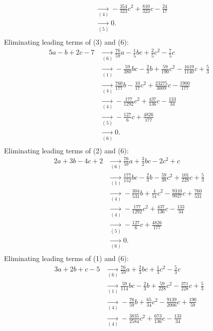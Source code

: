 {\begin{align*}
\\ &\underset{(4)}{\rightarrow}-\frac{354}{323}c^{2}+\frac{810}{323}c-\frac{24}{17}
\\ &\underset{(5)}{\rightarrow}0
.\\ \end{align*}
Eliminating leading terms of (3) and (6):
\begin{align*}
5a-b+2c-7&\underset{(6)}{\rightarrow}\frac{76}{59}a-\frac{1}{5}bc+\frac{2}{5}c^{2}-\frac{7}{5}c
\\ &\underset{(1)}{\rightarrow}-\frac{59}{380}bc-\frac{2}{3}b+\frac{59}{190}c^{2}-\frac{1619}{1140}c+\frac{5}{3}
\\ &\underset{(4)}{\rightarrow}\frac{760}{177}b-\frac{10}{17}c^{2}+\frac{23275}{3009}c-\frac{1900}{177}
\\ &\underset{(4)}{\rightarrow}-\frac{177}{1292}c^{2}+\frac{437}{136}c-\frac{133}{34}
\\ &\underset{(5)}{\rightarrow}-\frac{127}{6}c+\frac{4826}{177}
\\ &\underset{(6)}{\rightarrow}0
.\\ \end{align*}
Eliminating leading terms of (2) and (6):
\begin{align*}
2a+3b-4c+2&\underset{(6)}{\rightarrow}\frac{76}{59}a+\frac{3}{2}bc-2c^{2}+c
\\ &\underset{(1)}{\rightarrow}\frac{177}{152}bc-\frac{2}{3}b-\frac{59}{38}c^{2}+\frac{101}{228}c+\frac{5}{3}
\\ &\underset{(4)}{\rightarrow}-\frac{304}{531}b+\frac{4}{51}c^{2}-\frac{9310}{9027}c+\frac{760}{531}
\\ &\underset{(4)}{\rightarrow}-\frac{177}{1292}c^{2}+\frac{437}{136}c-\frac{133}{34}
\\ &\underset{(5)}{\rightarrow}-\frac{127}{6}c+\frac{4826}{177}
\\ &\underset{(6)}{\rightarrow}0
.\\ \end{align*}
Eliminating leading terms of (1) and (6):
\begin{align*}
3a+2b+c-5&\underset{(6)}{\rightarrow}\frac{76}{59}a+\frac{2}{3}bc+\frac{1}{3}c^{2}-\frac{5}{3}c
\\ &\underset{(1)}{\rightarrow}\frac{59}{114}bc-\frac{2}{3}b+\frac{59}{228}c^{2}-\frac{371}{228}c+\frac{5}{3}
\\ &\underset{(4)}{\rightarrow}-\frac{76}{59}b+\frac{65}{34}c^{2}-\frac{9139}{2006}c+\frac{190}{59}
\\ &\underset{(4)}{\rightarrow}-\frac{3835}{2584}c^{2}+\frac{673}{136}c-\frac{133}{34}

\end{align*}}
